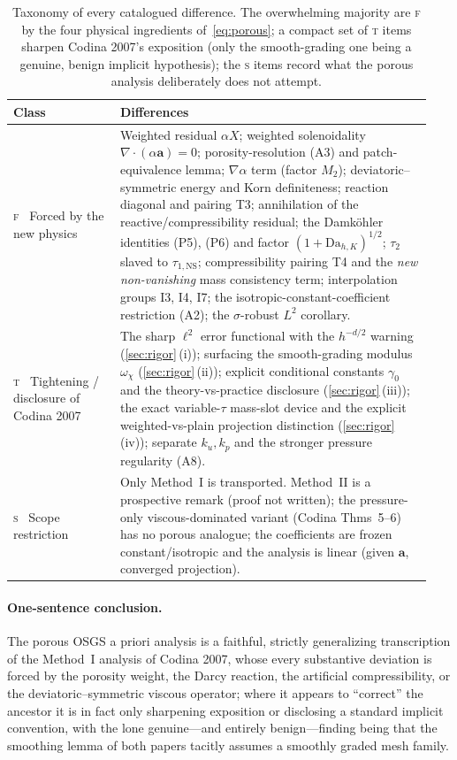 \documentclass[11pt]{article}
\theoremstyle{remark}
\newcommand{\ba}{\boldsymbol{a}}
\newcommand{\tns}{\tau_{1,\mathrm{NS}}}
\newcommand{\Dah}{\mathrm{Da}_{h,K}}
\newcommand{\forced}{\textsc{f}\xspace}   %
\newcommand{\tight}{\textsc{t}\xspace}    %
\newcommand{\scope}{\textsc{s}\xspace}    %
\begin{document}
\begin{table}[htbp]
\centering
\small
\renewcommand{\arraystretch}{1.3}
\begin{tabular}{@{}p{0.24\linewidth}p{0.70\linewidth}@{}}
\toprule
Class & Differences \\
\midrule
\forced{} \ Forced by the new physics
 & Weighted residual $\alpha X$; weighted solenoidality $\nabla\cdot(\alpha\ba)=0$;
   porosity-resolution (A3) and patch-equivalence lemma; $\nabla\alpha$ term (factor $M_2$);
   deviatoric--symmetric energy and Korn definiteness; reaction diagonal and pairing T3;
   annihilation of the reactive/compressibility residual; the Damk\"ohler identities (P5),
   (P6) and factor $(1+\Dah)^{1/2}$; $\tau_2$ slaved to $\tns$; compressibility pairing T4
   and the \emph{new non-vanishing} mass consistency term; interpolation groups I3, I4, I7;
   the isotropic-constant-coefficient restriction (A2); the $\sigma$-robust $L^2$ corollary. \\
\tight{} \ Tightening / disclosure of Codina 2007
 & The sharp $\ell^2$ error functional with the $h^{-d/2}$ warning
   (\cref{sec:rigor}\,(i)); surfacing the smooth-grading modulus $\omega_\chi$
   (\cref{sec:rigor}\,(ii)); explicit conditional constants $\gamma_0$ and the
   theory-vs-practice disclosure (\cref{sec:rigor}\,(iii)); the exact
   variable-$\tau$ mass-slot device and the explicit weighted-vs-plain projection distinction
   (\cref{sec:rigor}\,(iv)); separate $k_u,k_p$ and the stronger pressure regularity (A8). \\
\scope{} \ Scope restriction
 & Only Method~I is transported. Method~II is a prospective remark (proof not written);
   the pressure-only viscous-dominated variant (Codina Thms~5--6) has no porous analogue;
   the coefficients are frozen constant/isotropic and the analysis is linear (given
   $\ba$, converged projection). \\
\bottomrule
\end{tabular}
\caption{Taxonomy of every catalogued difference. The overwhelming majority are \forced{}
by the four physical ingredients of~\cref{eq:porous}; a compact set of \tight{} items sharpen
Codina 2007's exposition (only the smooth-grading one being a genuine, benign implicit
hypothesis); the \scope{} items record what the porous analysis deliberately does not
attempt.}
\label{tab:taxonomy}
\end{table}

\paragraph{One-sentence conclusion.} The porous OSGS a priori analysis is a faithful,
strictly generalizing transcription of the Method~I analysis of Codina 2007, whose every
substantive deviation is forced by the porosity weight, the Darcy reaction, the artificial
compressibility, or the deviatoric--symmetric viscous operator; where it appears to
``correct'' the ancestor it is in fact only sharpening exposition or disclosing a standard
implicit convention, with the lone genuine---and entirely benign---finding being that the
smoothing lemma of both papers tacitly assumes a smoothly graded mesh family.
\end{document}
